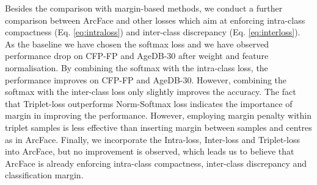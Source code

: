 \documentclass[10pt,twocolumn,letterpaper]{article}
\begin{document}
Besides the comparison with margin-based methods, we conduct a further comparison between ArcFace and other losses which aim at enforcing intra-class compactness (Eq. \ref{eq:intraloss}) and inter-class discrepancy (Eq. \ref{eq:interloss}). As the baseline we have chosen the softmax loss and we have observed performance drop on CFP-FP and AgeDB-30 after weight and feature normalisation. By combining the softmax with the intra-class loss, the performance improves on CFP-FP and AgeDB-30. However, combining the softmax with the inter-class loss only slightly improves the accuracy. The fact that Triplet-loss outperforms Norm-Softmax loss indicates the importance of margin in improving the performance. However, employing margin penalty within triplet samples is less effective than inserting margin between samples and centres as in ArcFace. Finally, we incorporate the Intra-loss, Inter-loss and Triplet-loss into ArcFace, but no improvement is observed, which leads us to believe that ArcFace is already enforcing intra-class compactness, inter-class discrepancy and classification margin.
\end{document}
